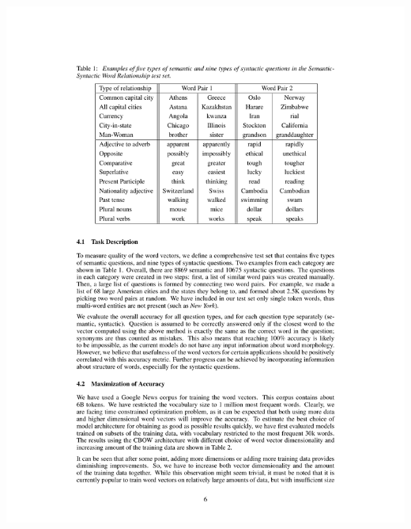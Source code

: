 \documentclass{beamer}
\begin{document}
\begin{frame}
\includegraphics[width=\linewidth]{mikolov-test-set}
\end{frame}
\end{document}
